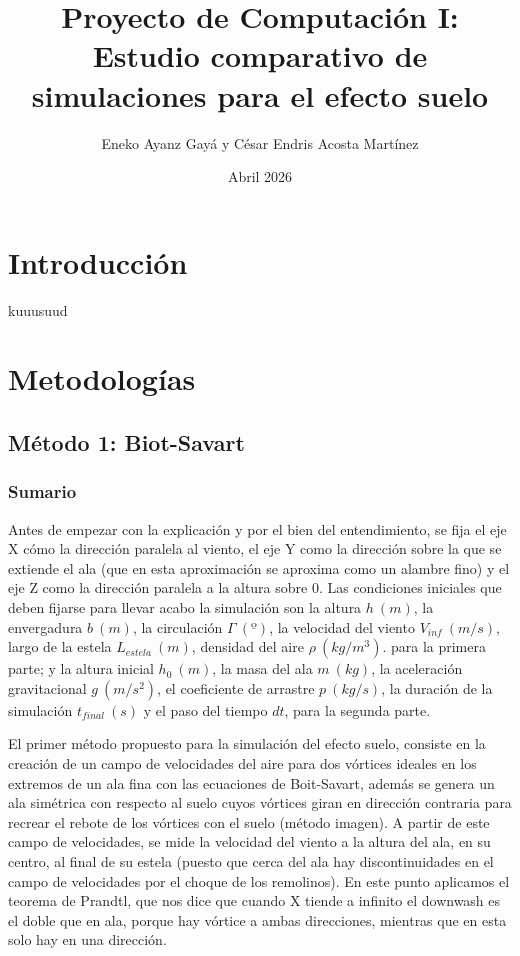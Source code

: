\documentclass[two column]{article}
\title{Proyecto de Computación I: Estudio comparativo de simulaciones para el efecto suelo}
\author{Eneko Ayanz Gayá y César Endris Acosta Martínez}
\date{Abril 2026}
\begin{document}
\maketitle

\section{Introducción}
\newpage
kuuusuud
\newpage

\section{Metodologías}
\vspace{0.5cm}
\subsection{Método 1: Biot-Savart}
\subsubsection{Sumario}

Antes de empezar con la explicación y por el bien del entendimiento, se fija el eje X cómo la dirección paralela al viento, el eje Y como la dirección sobre la que se extiende el ala (que en esta aproximación se aproxima como un alambre fino) y el eje Z como la dirección paralela a la altura sobre 0. Las condiciones iniciales que deben fijarse para llevar acabo la simulación son la altura $h\ (m)$, la envergadura $b\ (m)$, la circulación $\Gamma \ (º)$, la velocidad del viento $V_{inf} \ (m/s)$, largo de la estela $L_{estela} \ (m)$, densidad del aire $\rho \ (kg/m^3)$. para la primera parte; y la altura inicial $h_{0} \ (m)$, la masa del ala $m \ (kg)$, la aceleración gravitacional $g \ (m/s^2)$, el coeficiente de arrastre $p \ (kg/s)$, la duración de la simulación $t_{final} \ (s)$ y el paso del tiempo $dt$, para la segunda parte.
\vspace{0.5cm}

El primer método propuesto para la simulación del efecto suelo, consiste en la creación de un campo de velocidades del aire para dos vórtices ideales en los extremos de un ala fina con las ecuaciones de Boit-Savart, además se genera un ala simétrica con respecto al suelo cuyos vórtices giran en dirección contraria para recrear el rebote de los vórtices con el suelo (método imagen). A partir de este campo de velocidades, se mide la velocidad del viento a la altura del ala, en su centro, al final de su estela (puesto que cerca del ala hay discontinuidades en el campo de velocidades por el choque de los remolinos). En este punto aplicamos el teorema de Prandtl, que nos dice que cuando X tiende a infinito el downwash es el doble que en ala, porque hay vórtice a ambas direcciones, mientras que en esta solo hay en una dirección. 
\end{document}
